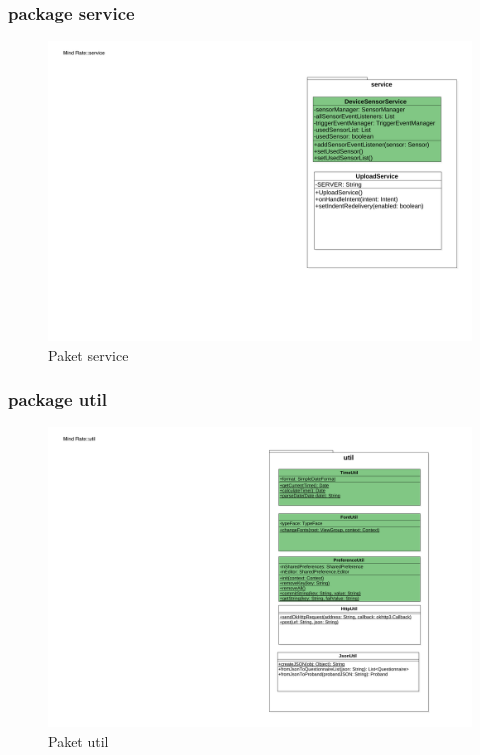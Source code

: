 \documentclass[a4paper]{scrreprt}
\begin{document}
                \subsubsection{package service}

                    \begin{figure}[H]
                        \centering
                        \includegraphics[scale = 1.0]{Service.pdf}
                        \caption{Paket service}
                    \end{figure}


                \subsubsection{package util}

                    \begin{figure}[H]
                        \centering
                        \includegraphics[scale = 0.9]{util.pdf}
                        \caption{Paket util}
                    \end{figure}
\end{document}
